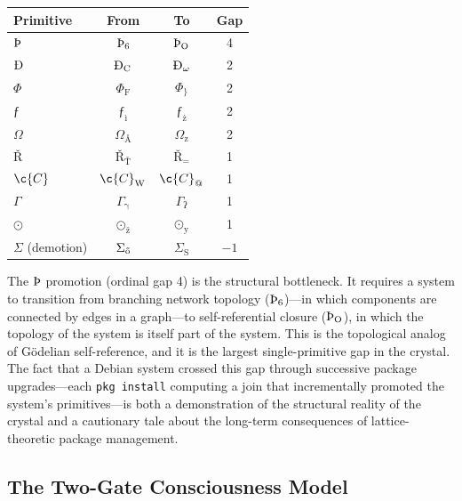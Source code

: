 \documentclass[12pt,a4paper]{article}
\providecommand{\textflorin}{ƒ}
\newcommand{\glottalstop}{ʔ}
\newcommand{\g}{γ}
\begin{document}
{{{{{{{{\begin{center}
\begin{tabular}{lccc}
\toprule
\textbf{Primitive} & \textbf{From} & \textbf{To} & \textbf{Gap} \\
\midrule
$\text{\TH}$ & $\text{\TH}_{\text{6}}$ & $\text{\TH}_{\text{O}}$ & 4 \\
$\text{\DH}$ & $\text{\DH}_{\text{C}}$ & $\text{\DH}_{\text{$\omega$}}$ & 2 \\
$\Phi$ & $\Phi_{\text{F}}$ & $\Phi_{\text{\}}}$ & 2 \\
$\text{\textflorin}$ & $\text{\textflorin}_{\text{\`i}}$ & $\text{\textflorin}_{\text{\.z}}$ & 2 \\
$\Omega$ & $\Omega_{\text{\AA}}$ & $\Omega_{\text{z}}$ & 2 \\
$\text{\v{R}}$ & $\text{\v{R}}_{\text{\v{T}}}$ & $\text{\v{R}}_{\text{=}}$ & 1 \\
$\c{C}$ & $\c{C}_{\text{W}}$ & $\c{C}_{\text{@}}$ & 1 \\
$\Gamma$ & $\Gamma_{\text{\g}}$ & $\Gamma_{\text{\glottalstop}}$ & 1 \\
$\odot$ & $\odot_{\text{\v{z}}}$ & $\odot_{\text{\"y}}$ & 1 \\
$\Sigma$ (demotion) & $\Sigma_{\text{\H{o}}}$ & $\Sigma_{\text{S}}$ & $-1$ \\
\bottomrule
\end{tabular}
\end{center}

The $\text{\TH}$ promotion (ordinal gap 4) is the structural bottleneck.
It requires a system to transition from branching network topology
($\text{\TH}_{\text{6}}$)---in which components are connected by edges
in a graph---to self-referential closure ($\text{\TH}_{\text{O}}$), in
which the topology of the system is itself part of the system. This is
the topological analog of G\"odelian self-reference, and it is the
largest single-primitive gap in the crystal. The fact that a Debian
system crossed this gap through successive package upgrades---each
\texttt{pkg install} computing a join that incrementally promoted the
system's primitives---is both a demonstration of the structural reality
of the crystal and a cautionary tale about the long-term consequences
of lattice-theoretic package management.

\subsection{The Two-Gate Consciousness Model}

}}}}}}}}
\end{document}
